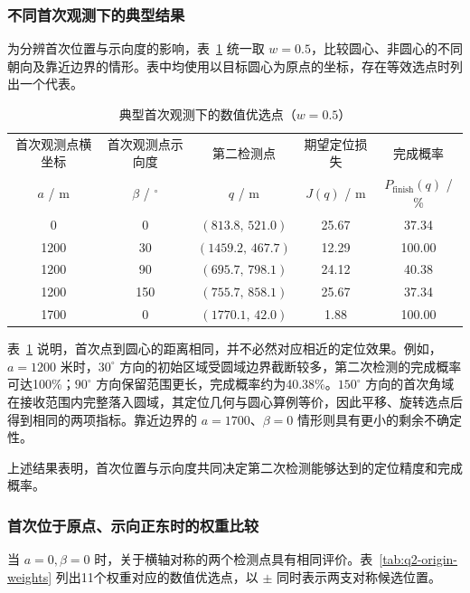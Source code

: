 \documentclass[UTF8,a4paper,zihao=-4,fontset=none]{ctexart}
\begin{document}
\subsubsection{不同首次观测下的典型结果}

为分辨首次位置与示向度的影响，表~\ref{tab:q2-typical-results} 统一取 \(w=0.5\)，比较圆心、非圆心的不同朝向及靠近边界的情形。表中均使用以目标圆心为原点的坐标，存在等效选点时列出一个代表。

\begin{table}[htbp]
  \centering
  \caption{典型首次观测下的数值优选点（\(w=0.5\)）}
  \label{tab:q2-typical-results}
  \small
  \renewcommand{\arraystretch}{1.08}
  \setlength{\tabcolsep}{4pt}
  \begin{tabular}{ccccc}
    \toprule
    首次观测点横坐标 & 首次观测点示向度 & 第二检测点 & 期望定位损失 & 完成概率 \\[-2pt]
    \(a\) / \(\mathrm{m}\) & \(\beta\) / \({}^\circ\) & \(q\) / \(\mathrm{m}\) & \(J(q)\) / \(\mathrm{m}\) & \(P_{\mathrm{finish}}(q)\) / \% \\
    \midrule
    0 & 0 & \((813.8,\,521.0)\) & 25.67 & 37.34 \\
    1200 & 30 & \((1459.2,\,467.7)\) & 12.29 & 100.00 \\
    1200 & 90 & \((695.7,\,798.1)\) & 24.12 & 40.38 \\
    1200 & 150 & \((755.7,\,858.1)\) & 25.67 & 37.34 \\
    1700 & 0 & \((1770.1,\,42.0)\) & 1.88 & 100.00 \\
    \bottomrule
  \end{tabular}
\end{table}

表~\ref{tab:q2-typical-results} 说明，首次点到圆心的距离相同，并不必然对应相近的定位效果。例如，\(a=1200\) 米时，\(30^\circ\) 方向的初始区域受圆域边界截断较多，第二次检测的完成概率可达100\%；\(90^\circ\) 方向保留范围更长，完成概率约为40.38\%。\(150^\circ\) 方向的首次角域在接收范围内完整落入圆域，其定位几何与圆心算例等价，因此平移、旋转选点后得到相同的两项指标。靠近边界的 \(a=1700\)、\(\beta=0\) 情形则具有更小的剩余不确定性。

上述结果表明，首次位置与示向度共同决定第二次检测能够达到的定位精度和完成概率。

\subsubsection{首次位于原点、示向正东时的权重比较}

当 \(a=0,\beta=0\) 时，关于横轴对称的两个检测点具有相同评价。表~\ref{tab:q2-origin-weights} 列出11个权重对应的数值优选点，以 \(\pm\) 同时表示两支对称候选位置。
\end{document}
